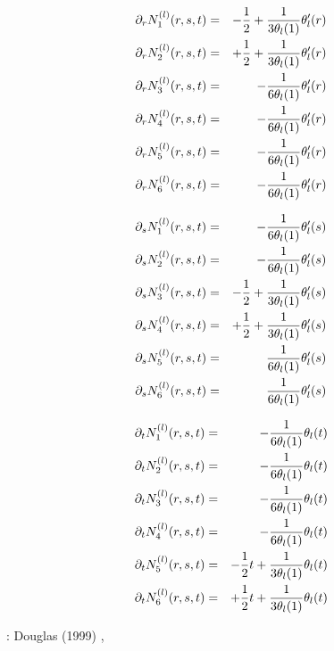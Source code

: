 \begin{eqnarray}
\partial_r N_1^{(l)}(r,s,t) &=&  - \frac12  + \frac{1}{3\theta_l(1)}\theta_l'(r)  \nonumber\\
\partial_r N_2^{(l)}(r,s,t) &=&  + \frac12  + \frac{1}{3\theta_l(1)}\theta_l'(r)  \nonumber\\
\partial_r N_3^{(l)}(r,s,t) &=&  -\frac{1}{6\theta_l(1)}\theta_l'(r)  \nonumber\\
\partial_r N_4^{(l)}(r,s,t) &=&  -\frac{1}{6\theta_l(1)}\theta_l'(r)  \nonumber\\
\partial_r N_5^{(l)}(r,s,t) &=&  -\frac{1}{6\theta_l(1)}\theta_l'(r)  \nonumber\\
\partial_r N_6^{(l)}(r,s,t) &=&  -\frac{1}{6\theta_l(1)}\theta_l'(r)  
\end{eqnarray}

\begin{eqnarray}
\partial_s N_1^{(l)}(r,s,t) &=&   -\frac{1}{6\theta_l(1)}\theta_l'(s) \nonumber\\
\partial_s N_2^{(l)}(r,s,t) &=&   -\frac{1}{6\theta_l(1)}\theta_l'(s) \nonumber\\
\partial_s N_3^{(l)}(r,s,t) &=& - \frac12  + \frac{1}{3\theta_l(1)}\theta_l'(s)  \nonumber\\
\partial_s N_4^{(l)}(r,s,t) &=& + \frac12  + \frac{1}{3\theta_l(1)}\theta_l'(s)  \nonumber\\
\partial_s N_5^{(l)}(r,s,t) &=&   \frac{1}{6\theta_l(1)}\theta_l'(s)  \nonumber\\
\partial_s N_6^{(l)}(r,s,t) &=&   \frac{1}{6\theta_l(1)}\theta_l'(s)  
\end{eqnarray}

\begin{eqnarray}
\partial_t N_1^{(l)}(r,s,t) &=& - \frac{1}{6\theta_l(1)}\theta_l(t)  \nonumber\\
\partial_t N_2^{(l)}(r,s,t) &=& - \frac{1}{6\theta_l(1)}\theta_l(t)  \nonumber\\
\partial_t N_3^{(l)}(r,s,t) &=& - \frac{1}{6\theta_l(1)}\theta_l(t)  \nonumber\\
\partial_t N_4^{(l)}(r,s,t) &=& - \frac{1}{6\theta_l(1)}\theta_l(t)  \nonumber\\
\partial_t N_5^{(l)}(r,s,t) &=& - \frac12 t + \frac{1}{3\theta_l(1)}\theta_l(t)  \nonumber\\
\partial_t N_6^{(l)}(r,s,t) &=& + \frac12 t + \frac{1}{3\theta_l(1)}\theta_l(t)  
\end{eqnarray}

\Literature: Douglas \etal (1999) \cite{doss99}, 

